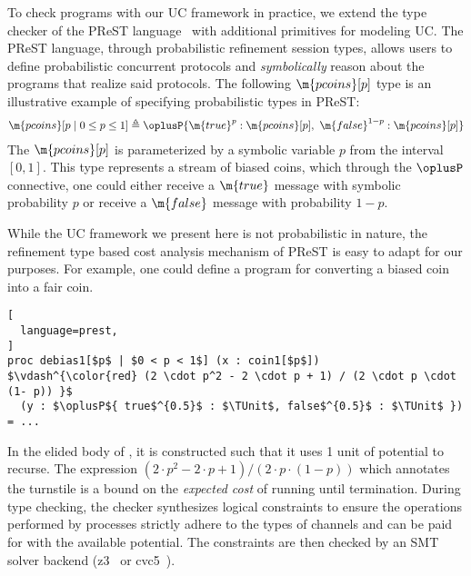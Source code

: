 To check programs with our UC framework in practice, we extend the type checker of the
PReST language~\cite{prest} with additional primitives for modeling UC. The PReST
language, through probabilistic refinement session types, allows users to define
probabilistic concurrent protocols and \emph{symbolically} reason about the programs that
realize said protocols. The following $\m{pcoins}[p]$ type is an illustrative example of 
specifying probabilistic types in PReST:
\begin{align*}
  \m{pcoins}[p \mid 0 \leq p \leq 1] \triangleq 
    \oplusP\{ \m{true}^{p} : \m{pcoins}[p]
           ,\ \m{false}^{1 - p} : \m{pcoins}[p] \}
\end{align*}
The $\m{pcoins}[p]$ is parameterized by a symbolic variable $p$ from the
interval $[0, 1]$. This type represents a stream of biased coins, which through
the $\oplusP$ connective, one could either receive a $\m{true}$ message
with symbolic probability $p$ or receive a $\m{false}$ message with
probability $1 - p$.

While the UC framework we present here is not probabilistic in nature, the 
refinement type based cost analysis mechanism of PReST is easy to adapt for our
purposes.  For example, one could define a  program for converting
a biased coin into a fair coin.
\begin{lstlisting}[
  language=prest,
]
proc debias1[$p$ | $0 < p < 1$] (x : coin1[$p$])
$\vdash^{\color{red} (2 \cdot p^2 - 2 \cdot p + 1) / (2 \cdot p \cdot (1- p)) }$ 
  (y : $\oplusP${ true$^{0.5}$ : $\TUnit$, false$^{0.5}$ : $\TUnit$ }) = ...
\end{lstlisting}
In the elided body of , it is constructed such that it uses 1 unit 
of potential to recurse. The expression $(2 \cdot p^2 - 2 \cdot p + 1) / (2 \cdot p \cdot (1- p))$
which annotates the turnstile is a bound on the \emph{expected cost} of running
 until termination. During type checking, the checker 
synthesizes logical constraints to ensure the operations
performed by processes strictly adhere to the types of
channels and can be paid for with the available potential.
The constraints are then checked by an SMT solver backend
(z3~\cite{Moura08Z3} or cvc5~\cite{Barbosa22CVC5}). 

